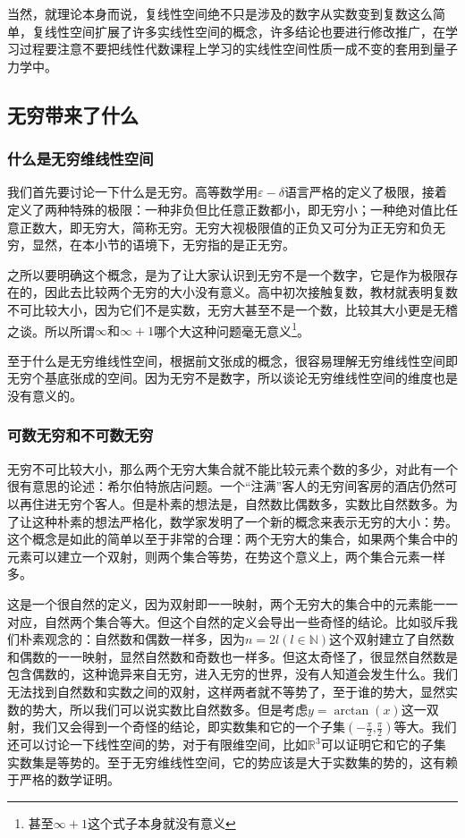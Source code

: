 \documentclass[../../main.tex]{subfiles}
\begin{document}
当然，就理论本身而说，复线性空间绝不只是涉及的数字从实数变到复数这么简单，复线性空间扩展了许多实线性空间的概念，许多结论也要进行修改推广，在学习过程要注意不要把线性代数课程上学习的实线性空间性质一成不变的套用到量子力学中。

\subsection{无穷带来了什么}
\subsubsection{什么是无穷维线性空间}
 我们首先要讨论一下什么是无穷。高等数学用\(\varepsilon-\delta\)语言严格的定义了极限，接着定义了两种特殊的极限：一种非负但比任意正数都小，即无穷小；一种绝对值比任意正数大，即无穷大，简称无穷。无穷大视极限值的正负又可分为正无穷和负无穷，显然，在本小节的语境下，无穷指的是正无穷。

 之所以要明确这个概念，是为了让大家认识到无穷不是一个数字，它是作为极限存在的，因此去比较两个无穷的大小没有意义。高中初次接触复数，教材就表明复数不可比较大小，因为它们不是实数，无穷大甚至不是一个数，比较其大小更是无稽之谈。所以所谓\(\infty\text{和}\infty+1\)哪个大这种问题毫无意义\footnote{甚至\(\infty+1\)这个式子本身就没有意义}。

 至于什么是无穷维线性空间，根据前文张成的概念，很容易理解无穷维线性空间即无穷个基底张成的空间。因为无穷不是数字，所以谈论无穷维线性空间的维度也是没有意义的。
\subsubsection{可数无穷和不可数无穷}
无穷不可比较大小，那么两个无穷大集合就不能比较元素个数的多少，对此有一个很有意思的论述：希尔伯特旅店问题。一个“注满”客人的无穷间客房的酒店仍然可以再住进无穷个客人。但是朴素的想法是，自然数比偶数多，实数比自然数多。为了让这种朴素的想法严格化，数学家发明了一个新的概念来表示无穷的大小：势。这个概念是如此的简单以至于非常的合理：两个无穷大的集合，如果两个集合中的元素可以建立一个双射，则两个集合等势，在势这个意义上，两个集合元素一样多。

这是一个很自然的定义，因为双射即一一映射，两个无穷大的集合中的元素能一一对应，自然两个集合等大。但这个自然的定义会导出一些奇怪的结论。比如驳斥我们朴素观念的：自然数和偶数一样多，因为\(n=2l\left(l \in \mathbb{N}\right)\)这个双射建立了自然数和偶数的一一映射，显然自然数和奇数也一样多。但这太奇怪了，很显然自然数是包含偶数的，这种诡异来自无穷，进入无穷的世界，没有人知道会发生什么。我们无法找到自然数和实数之间的双射，这样两者就不等势了，至于谁的势大，显然实数的势大，所以我们可以说实数比自然数多。但是考虑\(y=\arctan(x)\)这一双射，我们又会得到一个奇怪的结论，即实数集和它的一个子集\(\left(-\frac{\pi}{2}\text{,}\frac{\pi}{2}\right)\)等大。我们还可以讨论一下线性空间的势，对于有限维空间，比如\(\mathbb{R}^3\)可以证明它和它的子集实数集是等势的。至于无穷维线性空间，它的势应该是大于实数集的势的，这有赖于严格的数学证明。
\end{document}
